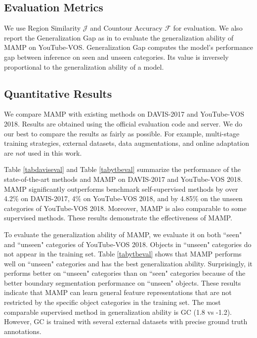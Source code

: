\documentclass[letterpaper]{article} \usepackage{aaai22}  \usepackage{times}  \usepackage{helvet}  \usepackage{courier}  \usepackage[hyphens]{url}  \usepackage{graphicx} \urlstyle{rm} \def\UrlFont{\rm}  \usepackage{natbib}  \usepackage{caption} \DeclareCaptionStyle{ruled}{labelfont=normalfont,labelsep=colon,strut=off} \frenchspacing  \setlength{\pdfpagewidth}{8.5in}  \setlength{\pdfpageheight}{11in}  \usepackage{algorithm}
\begin{document}
\subsection{Evaluation Metrics}
We use Region Similarity \( \mathcal{J} \) and Countour Accuracy \( \mathcal{F} \) for evaluation. We also report the Generalization Gap as in \cite{MAST} to evaluate the generalization ability of MAMP on YouTube-VOS. Generalization Gap computes the model's performance gap between inference on seen and unseen categories. Its value is inversely proportional to the generalization ability of a model.





\subsection{Quantitative Results}

We compare MAMP with existing methods on DAVIS-2017 and YouTube-VOS 2018. Results are obtained using the official evaluation code and server. We do our best to compare the results as fairly as possible. For example, multi-stage training strategies, external datasets, data augmentations, and online adaptation are $not$ used in this work.

Table \ref{tabdaviseval} and Table \ref{tabytbeval} summarize the performance of the state-of-the-art methods and MAMP on DAVIS-2017 and YouTube-VOS 2018. MAMP significantly outperforms benchmark self-supervised methods by over 4.2\% on DAVIS-2017, 4\% on YouTube-VOS 2018, and by 4.85\% on the unseen categories of YouTube-VOS 2018. Moreover, MAMP is also comparable to some supervised methods. These results demonstrate the effectiveness of MAMP.

To evaluate the generalization ability of MAMP, we evaluate it on both ``seen" and ``unseen" categories of YouTube-VOS 2018. Objects in ``unseen" categories do not appear in the training set. Table \ref{tabytbeval} shows that MAMP performs well on ``unseen" categories and has the best generalization ability. Surprisingly, it performs better on ``unseen" categories than on ``seen" categories because of the better boundary segmentation performance on ``unseen" objects. These results indicate that MAMP can learn general feature representations that are not restricted by the specific object categories in the training set. The most comparable supervised method in generalization ability is GC \cite{GC} (1.8 vs -1.2). However, GC is trained with several external datasets with precise ground truth annotations.
\end{document}
